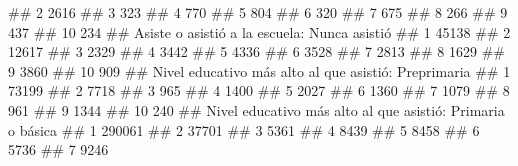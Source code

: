 \documentclass[11pt,]{article}
\newenvironment{Shaded}{\begin{snugshade}}{\end{snugshade}}
\newcommand{\StringTok}[1]{\textcolor[rgb]{0.31,0.60,0.02}{#1}}
\begin{document}
\begin{Shaded}
\begin{Highlighting}[]
{{{{\StringTok{## 2                                           2616}
\StringTok{## 3                                            323}
\StringTok{## 4                                            770}
\StringTok{## 5                                            804}
\StringTok{## 6                                            320}
\StringTok{## 7                                            675}
\StringTok{## 8                                            266}
\StringTok{## 9                                            437}
\StringTok{## 10                                           234}
\StringTok{##    Asiste o asistió a la escuela: Nunca asistió}
\StringTok{## 1                                         45138}
\StringTok{## 2                                         12617}
\StringTok{## 3                                          2329}
\StringTok{## 4                                          3442}
\StringTok{## 5                                          4336}
\StringTok{## 6                                          3528}
\StringTok{## 7                                          2813}
\StringTok{## 8                                          1629}
\StringTok{## 9                                          3860}
\StringTok{## 10                                          909}
\StringTok{##    Nivel educativo más alto al que asistió: Preprimaria}
\StringTok{## 1                                                 73199}
\StringTok{## 2                                                  7718}
\StringTok{## 3                                                   965}
\StringTok{## 4                                                  1400}
\StringTok{## 5                                                  2027}
\StringTok{## 6                                                  1360}
\StringTok{## 7                                                  1079}
\StringTok{## 8                                                   961}
\StringTok{## 9                                                  1344}
\StringTok{## 10                                                  240}
\StringTok{##    Nivel educativo más alto al que asistió: Primaria o básica}
\StringTok{## 1                                                      290061}
\StringTok{## 2                                                       37701}
\StringTok{## 3                                                        5361}
\StringTok{## 4                                                        8439}
\StringTok{## 5                                                        8458}
\StringTok{## 6                                                        5736}
\StringTok{## 7                                                        9246}
}}}}
\end{Highlighting}
\end{Shaded}
\end{document}
